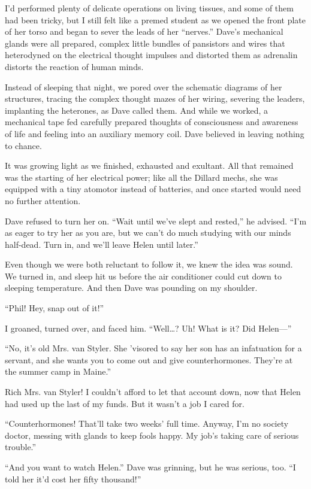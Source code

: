 \documentclass{article}
\begin{document}
I’d performed plenty of delicate operations on living tissues, and some of them had been tricky, but I still felt like a premed student as we opened the front plate of her torso and began to sever the leads of her “nerves.” Dave’s mechanical glands were all prepared, complex little bundles of pansistors and wires that heterodyned on the electrical thought impulses and distorted them as adrenalin distorts the reaction of human minds.

Instead of sleeping that night, we pored over the schematic diagrams of her structures, tracing the complex thought mazes of her wiring, severing the leaders, implanting the heterones, as Dave called them. And while we worked, a mechanical tape fed carefully prepared thoughts of consciousness and awareness of life and feeling into an auxiliary memory coil. Dave believed in leaving nothing to chance.

It was growing light as we finished, exhausted and exultant. All that remained was the starting of her electrical power; like all the Dillard mechs, she was equipped with a tiny atomotor instead of batteries, and once started would need no further attention.

Dave refused to turn her on. “Wait until we’ve slept and rested,” he advised. “I’m as eager to try her as you are, but we can’t do much studying with our minds half-dead. Turn in, and we’ll leave Helen until later.”

Even though we were both reluctant to follow it, we knew the idea was sound. We turned in, and sleep hit us before the air conditioner could cut down to sleeping temperature. And then Dave was pounding on my shoulder.

“Phil! Hey, snap out of it!”

I groaned, turned over, and faced him. “Well…? Uh! What is it? Did Helen—”

“No, it’s old Mrs. van Styler. She ’visored to say her son has an infatuation for a servant, and she wants you to come out and give counterhormones. They’re at the summer camp in Maine.”

Rich Mrs. van Styler! I couldn’t afford to let that account down, now that Helen had used up the last of my funds. But it wasn’t a job I cared for.

“Counterhormones! That’ll take two weeks’ full time. Anyway, I’m no society doctor, messing with glands to keep fools happy. My job’s taking care of serious trouble.”

“And you want to watch Helen.” Dave was grinning, but he was serious, too. “I told her it’d cost her fifty thousand!”
\end{document}
